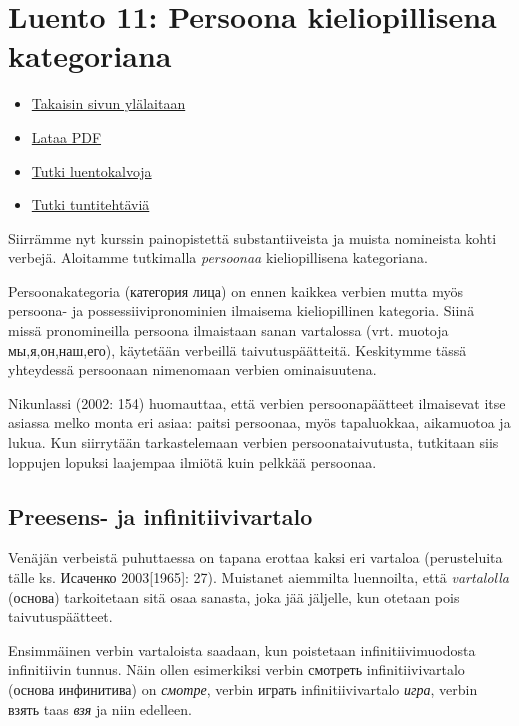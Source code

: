 \documentclass[]{scrartcl}
\providecommand{\tightlist}{%
  \setlength{\itemsep}{0pt}\setlength{\parskip}{0pt}}
\begin{document}
\section{Luento 11: Persoona kieliopillisena
kategoriana}\label{luento-11-persoona-kieliopillisena-kategoriana}

\begin{itemize}
\tightlist
\item
  \href{https://mustikka.uta.fi/~juho_harme/morfologia/\#tästä-kurssista}{Takaisin
  sivun ylälaitaan}
\item
  \href{http://mustikka.uta.fi/~juho_harme/morfologia/materiaalit/luento11.pdf}{Lataa
  PDF}
\item
  \href{http://mustikka.uta.fi/~juho_harme/morfologia/presentations/luento11.html}{Tutki
  luentokalvoja}
\item
  \href{http://mustikka.uta.fi/~juho_harme/morfologia/tehtavat/luento11.pdf}{Tutki
  tuntitehtäviä}
\end{itemize}

Siirrämme nyt kurssin painopistettä substantiiveista ja muista
nomineista kohti verbejä. Aloitamme tutkimalla \emph{persoonaa}
kieliopillisena kategoriana.

Persoonakategoria (категория лица) on ennen kaikkea verbien mutta myös
persoona- ja possessiivipronominien ilmaisema kieliopillinen kategoria.
Siinä missä pronomineilla persoona ilmaistaan sanan vartalossa (vrt.
muotoja мы,я,он,наш,его), käytetään verbeillä taivutuspäätteitä.
Keskitymme tässä yhteydessä persoonaan nimenomaan verbien ominaisuutena.

Nikunlassi (2002: 154) huomauttaa, että verbien persoonapäätteet
ilmaisevat itse asiassa melko monta eri asiaa: paitsi persoonaa, myös
tapaluokkaa, aikamuotoa ja lukua. Kun siirrytään tarkastelemaan verbien
persoonataivutusta, tutkitaan siis loppujen lopuksi laajempaa ilmiötä
kuin pelkkää persoonaa.

\subsection{Preesens- ja
infinitiivivartalo}\label{preesens--ja-infinitiivivartalo}

Venäjän verbeistä puhuttaessa on tapana erottaa kaksi eri vartaloa
(perusteluita tälle ks. Исаченко 2003{[}1965{]}: 27). Muistanet
aiemmilta luennoilta, että \emph{vartalolla} (основа) tarkoitetaan sitä
osaa sanasta, joka jää jäljelle, kun otetaan pois taivutuspäätteet.

Ensimmäinen verbin vartaloista saadaan, kun poistetaan
infinitiivimuodosta infinitiivin tunnus. Näin ollen esimerkiksi verbin
смотреть infinitiivivartalo (основа инфинитива) on \emph{смотре}, verbin
играть infinitiivivartalo \emph{игра}, verbin взять taas \emph{взя} ja
niin edelleen.
\end{document}
